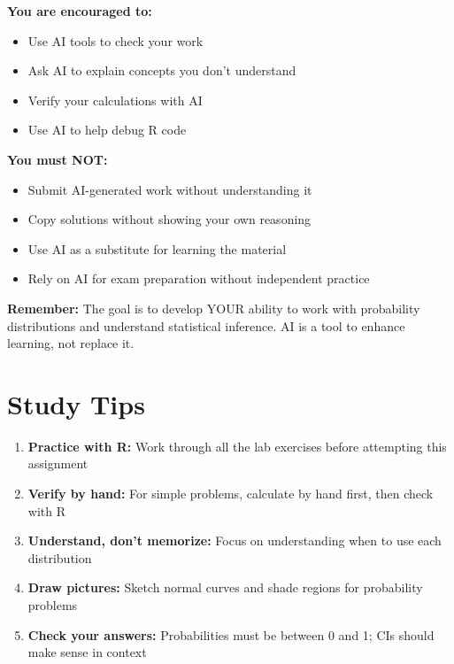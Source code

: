\documentclass[11pt]{article}
\begin{document}
\begin{tcolorbox}[colback=aiblue!10,colframe=aiblue,title=AI Usage Guidelines]

\textbf{You are encouraged to:}
\begin{itemize}
\item[+] Use AI tools to check your work
\item[+] Ask AI to explain concepts you don't understand
\item[+] Verify your calculations with AI
\item[+] Use AI to help debug R code
\end{itemize}

\textbf{You must NOT:}
\begin{itemize}
\item[-] Submit AI-generated work without understanding it
\item[-] Copy solutions without showing your own reasoning
\item[-] Use AI as a substitute for learning the material
\item[-] Rely on AI for exam preparation without independent practice
\end{itemize}

\textbf{Remember:} The goal is to develop YOUR ability to work with probability distributions and understand statistical inference. AI is a tool to enhance learning, not replace it.
\end{tcolorbox}

\section*{Study Tips}

\begin{enumerate}
\item \textbf{Practice with R:} Work through all the lab exercises before attempting this assignment
\item \textbf{Verify by hand:} For simple problems, calculate by hand first, then check with R
\item \textbf{Understand, don't memorize:} Focus on understanding when to use each distribution
\item \textbf{Draw pictures:} Sketch normal curves and shade regions for probability problems
\item \textbf{Check your answers:} Probabilities must be between 0 and 1; CIs should make sense in context
\end{enumerate}
\end{document}
